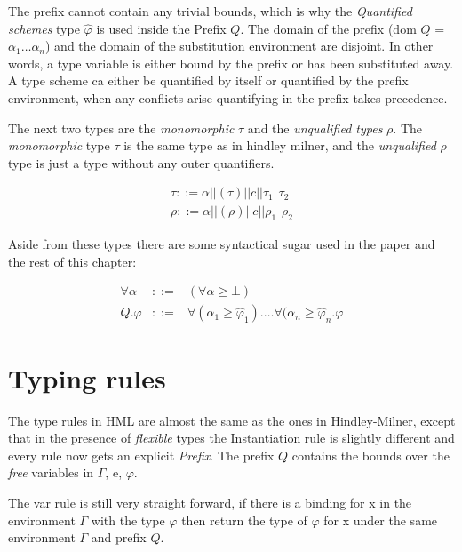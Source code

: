 The prefix cannot contain any trivial bounds, which is why the \emph{Quantified schemes} type $\hat{\varphi}$ is used inside the Prefix $Q$. The domain of the prefix (dom $Q$ = ${\alpha_1 \ldots \alpha_n}$) and the domain of the substitution environment are disjoint. In other words, a type variable is either bound by the prefix or has been substituted away. A type scheme ca either be quantified by itself or quantified by the prefix environment, when any conflicts arise quantifying in the prefix takes precedence.

The next two types are the \emph{monomorphic} $\tau$ and the \emph{unqualified types} $\rho$. The \emph{monomorphic} type $\tau$ is the same type as in hindley milner, and the \emph{unqualified} $\rho$ type is just a type without any outer quantifiers. 

\begin{eqnarray*}
\tau ::= \alpha || (\tau) || c || \tau_1 \hspace{5pt} \tau_2 \\
\rho ::= \alpha || (\rho) || c || \rho_1 \hspace{5pt} \rho_2
\end{eqnarray*}

Aside from these types there are some syntactical sugar used in the paper and the rest of this chapter:
\label{syntax}

\begin{eqnarray*}
\forall \alpha & ::= & (\forall \alpha \geq \bot) \\
Q.\varphi & ::= & \forall(\alpha_1 \geq \hat{\varphi}_1). \ldots \forall(\alpha_n \geq \hat{\varphi}_n . \varphi
\end{eqnarray*}

\section{Typing rules}
The type rules in HML are almost the same as the ones in Hindley-Milner, except that in the presence of \textit{flexible} types the Instantiation rule is slightly different and every rule now gets an explicit \textit{Prefix}. The prefix $Q$ contains the bounds over the \emph{free} variables in $\Gamma$, e, $\varphi$.

\begin{prooftree}
\end{prooftree}

The var rule is still very straight forward, if there is a binding for x in the environment $\Gamma$ with the type $\varphi$ then return the type of $\varphi$ for x under the same environment $\Gamma$ and prefix $Q$.

